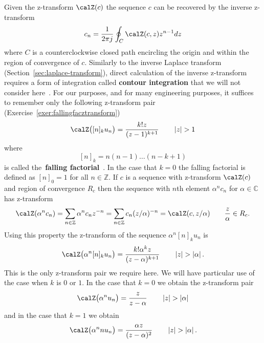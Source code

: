 \documentclass[11pt,a4paper]{book}
\theoremstyle{plain}
\numberwithin{equation}{section}
\newcommand{\ints}{{\mathbb Z}}
\newcommand{\complex}{{\mathbb C}}
\newcommand{\term}{\textbf}
\newcommand{\abs}[1]{\left\vert #1 \right\vert}
\begin{document}
\newcommand{\stirling}[2]{\genfrac{[}{]}{0pt}{}{#1}{#2}}
\newcommand{\eulerian}[2]{\genfrac{\langle}{\rangle}{0pt}{}{#1}{#2}}

Given the z-transform $\calZ(c)$ the sequence $c$ can be recovered by the inverse z-transform
\[
c_n = \frac{1}{2\pi j} \oint_C \calZ(c,z) z^{n-1} dz
\]
where $C$ is a counterclockwise closed path encircling the origin and within the region of convergence of $c$.  Similarly to the inverse Laplace transform (Section~\ref{sec:laplace-transform}), direct calculation of the inverse z-transform requires a form of integration called \term{contour integration} that we will not consider here~\citep{Stewart_ComplexAnalysis_2004}.  For our purposes, and for many engineering purposes, it suffices to remember only the following z-transform pair (Exercise~\ref{exer:fallingfacztransform})
\[
\calZ\big( [n]_k u_n \big) = \frac{k! z }{(z - 1)^{k+1}} \qquad \abs{z} > 1
\]
where
\[
[n]_k = n (n-1) \dots (n-k+1)
\]
is called the~\term{falling factorial}~\cite[p. 48]{concretemath_1994}.  In the case that $k=0$ the falling factorial is defined as $[n]_0 = 1$ for all $n\in\ints$.  If $c$ is a sequence with z-transform $\calZ(c)$ and region of convergence $R_c$ then the sequence with $n$th element $\alpha^nc_n$ for $\alpha \in \complex$ has z-transform 
\[
\calZ(\alpha^n c_n) = \sum_{n \in \ints} \alpha^n c_n z^{-n} = \sum_{n \in \ints} c_n (z/\alpha)^{-n} = \calZ(c, z/\alpha) \qquad \frac{z}{\alpha} \in R_c.
\]
Using this property the z-transform of the sequence $\alpha^n [n]_k u_n$ is
\begin{equation}\label{eeq:onlyztrans}
\calZ\big( \alpha^n [n]_k u_n \big) = \frac{k! \alpha^k z }{(z - \alpha)^{k+1}} \qquad \abs{z} > \abs{\alpha}.
\end{equation}
This is the only z-transform pair we require here.  We will have particular use of the case when $k$ is $0$ or $1$.  In the case that $k=0$ we obtain the z-transform pair
\[
\calZ\big( \alpha^n u_n \big) = \frac{ z }{z - \alpha} \qquad \abs{z} > \abs{\alpha}
\]
and in the case that $k=1$ we obtain
\[
\calZ\big( \alpha^n n u_n \big) = \frac{ \alpha z }{(z - \alpha)^{2}} \qquad \abs{z} > \abs{\alpha}.
\]

\end{document}
